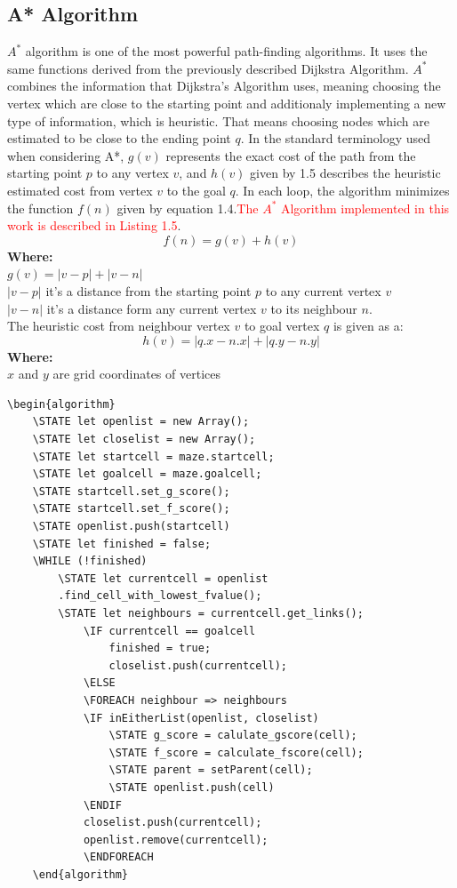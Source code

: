 \subsection{A* Algorithm}
$A^*$ algorithm is one of the most powerful path-finding algorithms. It uses the same functions derived from the previously described Dijkstra Algorithm. $A^*$ combines the information that Dijkstra’s Algorithm uses, meaning choosing the vertex which are close to the starting point and additionaly implementing a new type of information, which is heuristic. That means choosing nodes which are estimated to be close to the ending point $q$. 
In the standard terminology used when considering A*, $g(v)$ represents the exact cost of the path from the starting point $p$ to any vertex $v$, and $h(v)$ given by 1.5 describes the heuristic estimated cost from vertex $v$ to the goal $q$. In each loop, the algorithm minimizes the function $f(n)$ given by equation 1.4.\textcolor{red}{The $A^*$ Algorithm implemented in this work is described in Listing 1.5}.
\begin{equation}
f(n) = g(v) + h(v)
\end{equation}
\textbf{Where:}\\
$g(v)= |v - p| + |v - n|$\\
$|v - p|$ it's a distance from the starting point $p$ to any current vertex $v$\\
$|v - n|$ it's a distance form any current vertex $v$ to its neighbour $n$.\\
\newline
The heuristic cost from neighbour vertex $v$ to goal vertex $q$ is given as a:
\begin{equation}
h(v) = |q.x - n.x| + |q.y - n.y|
\end{equation}
\textbf{Where:}\\
$x$ and $y$ are grid coordinates of vertices\\

\begin{lstlisting}[caption={Pseudocode for a A* algorithm}]
	\begin{algorithm}
	\STATE let openlist = new Array();
	\STATE let closelist = new Array();
	\STATE let startcell = maze.startcell;
	\STATE let goalcell = maze.goalcell;
	\STATE startcell.set_g_score();
	\STATE startcell.set_f_score();
	\STATE openlist.push(startcell)
	\STATE let finished = false;
	\WHILE (!finished)
		\STATE let currentcell = openlist    
		.find_cell_with_lowest_fvalue();
		\STATE let neighbours = currentcell.get_links();
			\IF currentcell == goalcell
				finished = true;
				closelist.push(currentcell);
			\ELSE 
			\FOREACH neighbour => neighbours	
			\IF inEitherList(openlist, closelist)
				\STATE g_score = calulate_gscore(cell);
				\STATE f_score = calculate_fscore(cell);
				\STATE parent = setParent(cell);
				\STATE openlist.push(cell)
			\ENDIF
			closelist.push(currentcell);
			openlist.remove(currentcell);
	    	\ENDFOREACH
	\end{algorithm}
	\end{lstlisting}

